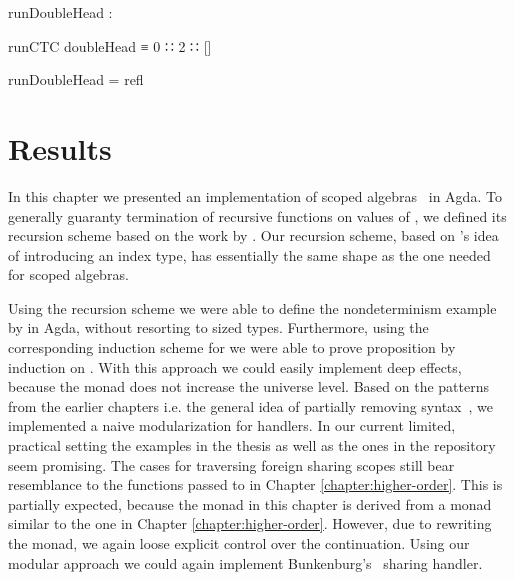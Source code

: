 \begin{center}
\begin{code}
runDoubleHead :
\end{code}
\begin{code}[inline]
 runCTC doubleHead ≡ 0 ∷ 2 ∷ []
\end{code}
\begin{code}
runDoubleHead = refl
\end{code}
\end{center}


\section{Results}

In this chapter we presented an implementation of scoped
algebras~\cite{DBLP:conf/lics/PirogSWJ18} in Agda.
To generally guaranty termination of recursive functions on values of
, we defined its recursion scheme based on the work by
\textcite{DBLP:journals/corr/abs-1806-05230}.
Our recursion scheme, based on \textcite{DBLP:journals/corr/abs-1806-05230}'s idea
of introducing an index type, has essentially the same shape as the one needed
for scoped algebras.

Using the recursion scheme we were able to define the nondeterminism example by
\textcite{DBLP:conf/lics/PirogSWJ18} in Agda, without resorting to sized types.
Furthermore, using the corresponding induction scheme for  we
were able to prove proposition by induction on .
With this approach we could easily implement deep effects, because the
 monad does not increase the universe level.
Based on the patterns from the earlier chapters i.e. the general idea of
partially removing syntax~\cite{DBLP:conf/haskell/SchrijversPWJ19}, we
implemented a naive modularization for handlers.
In our current limited, practical setting the examples in the thesis as well as
the ones in the repository seem promising.
The cases for traversing foreign sharing scopes still bear resemblance to the
functions passed to  in Chapter \ref{chapter:higher-order}.
This is partially expected, because the monad in this chapter is derived from a
monad similar to the one in Chapter \ref{chapter:higher-order}.
However, due to rewriting the monad, we again loose explicit control over the
continuation.
Using our modular approach we could again implement
Bunkenburg's~\cite{bunkenburg2019modeling} sharing handler.
